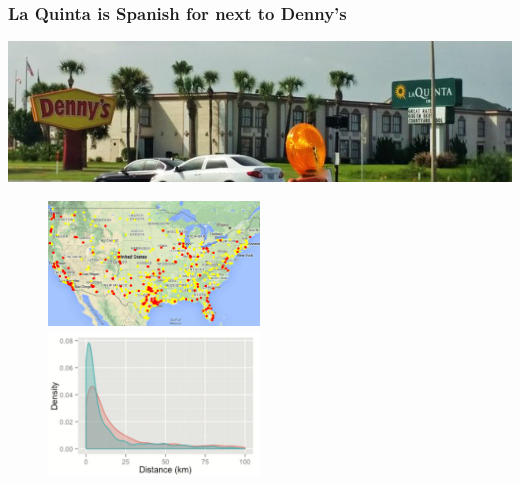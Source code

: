 \documentclass[12pt]{beamer}
\begin{document}

\begin{frame}[t]
\frametitle{La Quinta is Spanish for next to Denny's}

\includegraphics[width=\textwidth]{imgs/dennys_lq_signs.png} \\

\pause

\vspace{-5mm}

\begin{figure}[t!]

\includegraphics[width=0.5\textwidth,valign=t]{imgs/dennys_lq.png} 
\includegraphics[width=0.5\textwidth,valign=t]{imgs/dennys_lq_dens.png} 

\end{figure}

\end{frame}


\end{document}
